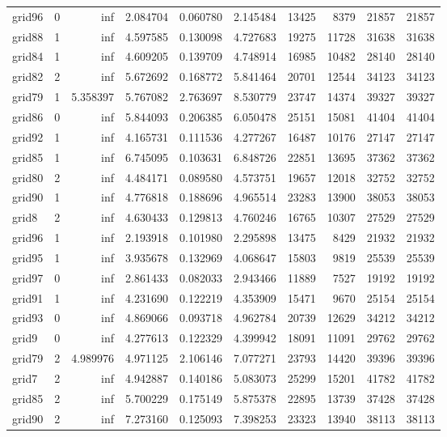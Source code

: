 \begin{longtable}{|l|r|r|r|r|r|r|r|r|r|}
grid96 & 0 & inf & 2.084704 & 0.060780 & 2.145484 & 13425 & 8379 & 21857 & 21857 \\
grid88 & 1 & inf & 4.597585 & 0.130098 & 4.727683 & 19275 & 11728 & 31638 & 31638 \\
grid84 & 1 & inf & 4.609205 & 0.139709 & 4.748914 & 16985 & 10482 & 28140 & 28140 \\
grid82 & 2 & inf & 5.672692 & 0.168772 & 5.841464 & 20701 & 12544 & 34123 & 34123 \\
grid79 & 1 & 5.358397 & 5.767082 & 2.763697 & 8.530779 & 23747 & 14374 & 39327 & 39327 \\
grid86 & 0 & inf & 5.844093 & 0.206385 & 6.050478 & 25151 & 15081 & 41404 & 41404 \\
grid92 & 1 & inf & 4.165731 & 0.111536 & 4.277267 & 16487 & 10176 & 27147 & 27147 \\
grid85 & 1 & inf & 6.745095 & 0.103631 & 6.848726 & 22851 & 13695 & 37362 & 37362 \\
grid80 & 2 & inf & 4.484171 & 0.089580 & 4.573751 & 19657 & 12018 & 32752 & 32752 \\
grid90 & 1 & inf & 4.776818 & 0.188696 & 4.965514 & 23283 & 13900 & 38053 & 38053 \\
grid8 & 2 & inf & 4.630433 & 0.129813 & 4.760246 & 16765 & 10307 & 27529 & 27529 \\
grid96 & 1 & inf & 2.193918 & 0.101980 & 2.295898 & 13475 & 8429 & 21932 & 21932 \\
grid95 & 1 & inf & 3.935678 & 0.132969 & 4.068647 & 15803 & 9819 & 25539 & 25539 \\
grid97 & 0 & inf & 2.861433 & 0.082033 & 2.943466 & 11889 & 7527 & 19192 & 19192 \\
grid91 & 1 & inf & 4.231690 & 0.122219 & 4.353909 & 15471 & 9670 & 25154 & 25154 \\
grid93 & 0 & inf & 4.869066 & 0.093718 & 4.962784 & 20739 & 12629 & 34212 & 34212 \\
grid9 & 0 & inf & 4.277613 & 0.122329 & 4.399942 & 18091 & 11091 & 29762 & 29762 \\
grid79 & 2 & 4.989976 & 4.971125 & 2.106146 & 7.077271 & 23793 & 14420 & 39396 & 39396 \\
grid7 & 2 & inf & 4.942887 & 0.140186 & 5.083073 & 25299 & 15201 & 41782 & 41782 \\
grid85 & 2 & inf & 5.700229 & 0.175149 & 5.875378 & 22895 & 13739 & 37428 & 37428 \\
grid90 & 2 & inf & 7.273160 & 0.125093 & 7.398253 & 23323 & 13940 & 38113 & 38113 \\

\end{longtable}

